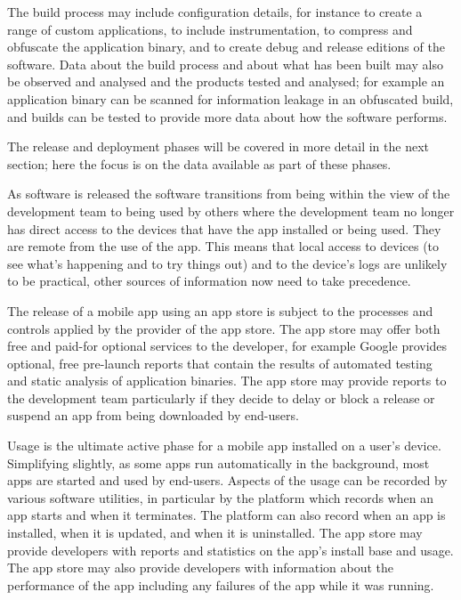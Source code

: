 The build process may include configuration details, for instance to create a range of custom applications, to include instrumentation, to compress and obfuscate the application binary, and to create debug and release editions of the software. Data about the build process and about what has been built may also be observed and analysed and the products tested and analysed; for example an application binary can be scanned for information leakage in an obfuscated build, and builds can be tested to provide more data about how the software performs.

The release and deployment phases will be covered in more detail in the next section; here the focus is on the data available as part of these phases. 

As software is released the software transitions from being within the view of the development team to being used by others where the development team no longer has direct access to the devices that have the app installed or being used. They are remote from the use of the app. This means that local access to devices (to see what's happening and to try things out) and to the device's logs are unlikely to be practical, other sources of information now need to take precedence.

The release of a mobile app using an app store is subject to the processes and controls applied by the provider of the app store. The app store may offer both free and paid-for optional services to the developer, for example Google provides optional, free pre-launch reports that contain the results of automated testing and static analysis of application binaries. The app store may provide reports to the development team particularly if they decide to delay or block a release or suspend an app from being downloaded by end-users.

Usage is the ultimate active phase for a mobile app installed on a user's device. Simplifying slightly, as some apps run automatically in the background, most apps are started and used by end-users. Aspects of the usage can be recorded by various software utilities, in particular by the platform which records when an app starts and when it terminates. The platform can also record when an app is installed, when it is updated, and when it is uninstalled. The app store may provide developers with reports and statistics on the app's install base and usage. The app store may also provide developers with information about the performance of the app including any failures of the app while it was running.

